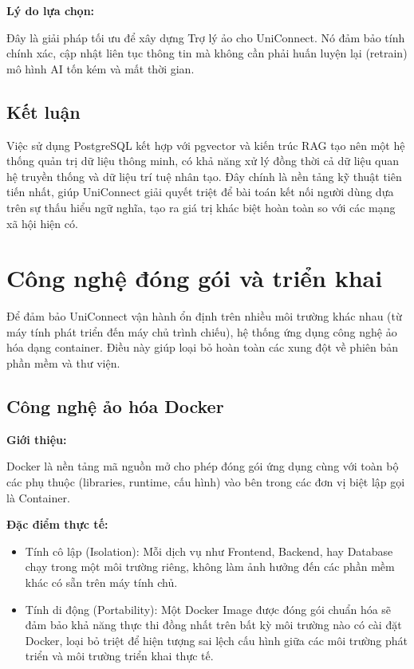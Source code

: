 \textbf{Lý do lựa chọn:}

Đây là giải pháp tối ưu để xây dựng Trợ lý ảo cho UniConnect. Nó đảm bảo tính chính xác, cập nhật liên tục thông tin mà không cần phải huấn luyện lại (retrain) mô hình AI tốn kém và mất thời gian.

\subsection{Kết luận}

Việc sử dụng PostgreSQL kết hợp với pgvector và kiến trúc RAG tạo nên một hệ thống quản trị dữ liệu thông minh, có khả năng xử lý đồng thời cả dữ liệu quan hệ truyền thống và dữ liệu trí tuệ nhân tạo. Đây chính là nền tảng kỹ thuật tiên tiến nhất, giúp UniConnect giải quyết triệt để bài toán kết nối người dùng dựa trên sự thấu hiểu ngữ nghĩa, tạo ra giá trị khác biệt hoàn toàn so với các mạng xã hội hiện có.

\section{Công nghệ đóng gói và triển khai}

Để đảm bảo UniConnect vận hành ổn định trên nhiều môi trường khác nhau (từ máy tính phát triển đến máy chủ trình chiếu), hệ thống ứng dụng công nghệ ảo hóa dạng container. Điều này giúp loại bỏ hoàn toàn các xung đột về phiên bản phần mềm và thư viện\cite{merkel2014docker}.

\subsection{Công nghệ ảo hóa Docker}

\textbf{Giới thiệu:}

Docker là nền tảng mã nguồn mở cho phép đóng gói ứng dụng cùng với toàn bộ các phụ thuộc (libraries, runtime, cấu hình) vào bên trong các đơn vị biệt lập gọi là Container\cite{turnbull2014docker}.

\textbf{Đặc điểm thực tế:}

\begin{itemize}
    \item Tính cô lập (Isolation): Mỗi dịch vụ như Frontend, Backend, hay Database chạy trong một môi trường riêng, không làm ảnh hưởng đến các phần mềm khác có sẵn trên máy tính chủ.

    \item Tính di động (Portability): Một Docker Image được đóng gói chuẩn hóa sẽ đảm bảo khả năng thực thi đồng nhất trên bất kỳ môi trường nào có cài đặt Docker, loại bỏ triệt để hiện tượng sai lệch cấu hình giữa các môi trường phát triển và môi trường triển khai thực tế.
\end{itemize}

